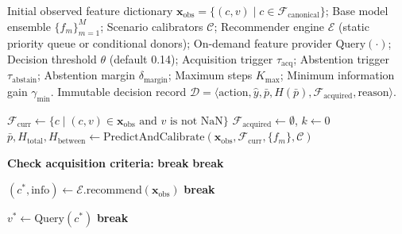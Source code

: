 
\begin{algorithm}[t]
\caption{Adaptive Decision Policy with Gated Acquisition and Abstention}
\label{alg:adaptive_policy}
\small
\begin{algorithmic}[1]
\REQUIRE Initial observed feature dictionary $\mathbf{x}_{\text{obs}} = \{(c, v) \mid c \in \mathcal{F}_{\text{canonical}}\}$;
Base model ensemble $\{f_m\}_{m=1}^M$; Scenario calibrators $\mathcal{C}$; Recommender engine $\mathcal{E}$ (static priority queue or conditional donors); On-demand feature provider $\text{Query}(\cdot)$; Decision threshold $\theta$ (default 0.14); Acquisition trigger $\tau_{\text{acq}}$; Abstention trigger $\tau_{\text{abstain}}$; Abstention margin $\delta_{\text{margin}}$; Maximum steps $K_{\max}$; Minimum information gain $\gamma_{\min}$.
\ENSURE Immutable decision record $\mathcal{D} = \langle \text{action}, \hat{y}, \bar{p}, H(\bar{p}), \mathcal{F}_{\text{acquired}}, \text{reason} \rangle$.

\STATE $\mathcal{F}_{\text{curr}} \leftarrow \{c \mid (c, v) \in \mathbf{x}_{\text{obs}} \text{ and } v \text{ is not NaN}\}$
\STATE $\mathcal{F}_{\text{acquired}} \leftarrow \emptyset$, \quad $k \leftarrow 0$
\STATE $\bar{p}, H_{\text{total}}, H_{\text{between}} \leftarrow \text{PredictAndCalibrate}(\mathbf{x}_{\text{obs}}, \mathcal{F}_{\text{curr}}, \{f_m\}, \mathcal{C})$

    \STATE \textbf{Check acquisition criteria:}
        \STATE \textbf{break} 
    \ENDIF
        \STATE \textbf{break} 
    \ENDIF

    \STATE $(c^*, \text{info}) \leftarrow \mathcal{E}.\text{recommend}(\mathbf{x}_{\text{obs}})$
        \STATE \textbf{break} 
    \ENDIF

    \STATE {}
    \STATE $v^* \leftarrow \text{Query}(c^*)$
        \STATE \textbf{break} 
    \ENDIF


\end{algorithmic}
\end{algorithm}
